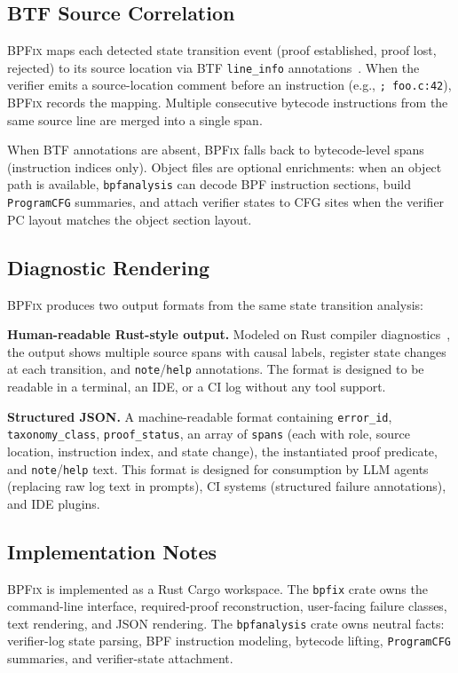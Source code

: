\documentclass[sigplan,10pt,anonymous,review]{acmart}
\newcommand{\sys}{\textsc{BPFix}\xspace}
\begin{document}
\subsection{BTF Source Correlation}

\sys maps each detected state transition event (proof established, proof lost,
rejected) to its source location via BTF \texttt{line\_info}
annotations~\cite{linuxbtf}.
When the verifier emits a source-location comment before an instruction (e.g.,
\texttt{; foo.c:42}), \sys records the mapping.  Multiple consecutive bytecode
instructions from the same source line are merged into a single span.

When BTF annotations are absent, \sys falls back to bytecode-level spans
(instruction indices only).  Object files are optional enrichments: when an
object path is available, \texttt{bpfanalysis} can decode BPF instruction
sections, build \texttt{ProgramCFG} summaries, and attach verifier states to CFG
sites when the verifier PC layout matches the object section layout.

\subsection{Diagnostic Rendering}

\sys produces two output formats from the same state transition analysis:

\textbf{Human-readable Rust-style output.}  Modeled on Rust compiler
diagnostics~\cite{rustdiag2016}, the output shows multiple source spans
with causal labels, register state changes at each transition, and
\texttt{note}/\texttt{help} annotations.  The format is designed to be
readable in a terminal, an IDE, or a CI log without any tool support.

\textbf{Structured JSON.}  A machine-readable format containing
\texttt{error\_id}, \texttt{taxonomy\_class}, \texttt{proof\_status}, an array
of \texttt{spans} (each with role, source location, instruction index, and
state change), the instantiated proof predicate, and \texttt{note}/\texttt{help}
text.  This format is designed for consumption by LLM agents (replacing raw
log text in prompts), CI systems (structured failure annotations), and IDE
plugins.

\subsection{Implementation Notes}

\sys is implemented as a Rust Cargo workspace.  The \texttt{bpfix} crate owns
the command-line interface, required-proof reconstruction, user-facing failure
classes, text rendering, and JSON rendering.  The \texttt{bpfanalysis} crate
owns neutral facts: verifier-log state parsing, BPF instruction modeling,
bytecode lifting, \texttt{ProgramCFG} summaries, and verifier-state attachment.
\end{document}
